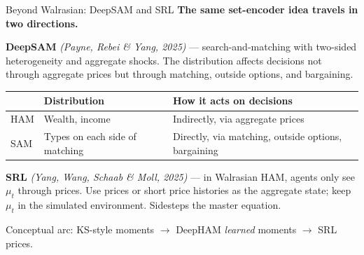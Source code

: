 \documentclass[aspectratio=169,11pt]{beamer}
\newcommand{\emphc}[1]{\textcolor{harvardcrimson}{#1}}
\begin{document}
\begin{frame}{Beyond Walrasian: DeepSAM and SRL}
\footnotesize
\textbf{The same set-encoder idea travels in two directions.}

\vspace{0.3em}
\textbf{DeepSAM} \emph{(Payne, Rebei \& Yang, 2025)} --- search-and-matching with two-sided heterogeneity and aggregate shocks.  The distribution affects decisions \emphc{not} through aggregate prices but through matching, outside options, and bargaining.

\vspace{0.2em}
\begin{center}\scriptsize
\begin{tabular}{p{1.4cm} p{3.0cm} p{5.0cm}}
\toprule
 & Distribution & How it acts on decisions \\
\midrule
HAM & Wealth, income & Indirectly, via aggregate prices \\
SAM & Types on each side of matching & Directly, via matching, outside options, bargaining \\
\bottomrule
\end{tabular}\end{center}

\vspace{0.3em}
\textbf{SRL} \emph{(Yang, Wang, Schaab \& Moll, 2025)} --- in Walrasian HAM, agents only see $\mu_t$ through prices.  Use \emphc{prices or short price histories as the aggregate state}; keep $\mu_t$ in the simulated environment.  Sidesteps the master equation.

\vspace{0.2em}
{\scriptsize Conceptual arc: KS-style moments $\to$ DeepHAM \emph{learned} moments $\to$ SRL prices.}
\end{frame}
\end{document}
